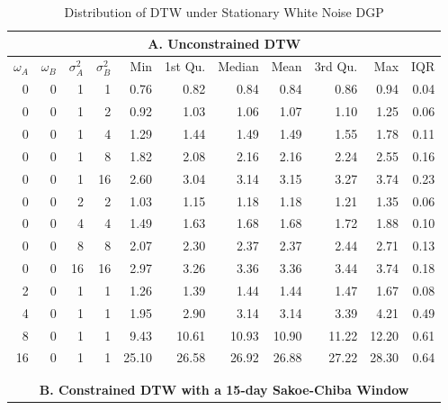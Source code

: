 \begin{table}[!ht]
    \centering
    \fontsize{10pt}{10pt}\selectfont
    \begin{threeparttable}
        \caption{Distribution of DTW under Stationary White Noise DGP} \label{tbl:dtw_white_noise}
        \begin{tabular}{r r r r | r r r r r r r}
            \multicolumn{11}{c}{\textbf{A. Unconstrained DTW}} \\
            \midrule
            $\omega_{A}$ & $\omega_{B}$ & $\sigma^{2}_{A}$ & $\sigma^{2}_{B}$ & Min & 1st Qu. & Median & Mean & 3rd Qu. & Max & IQR \\
            \midrule
            0  & 0 & 1  & 1  & 0.76 & 0.82 & 0.84 & 0.84 & 0.86 & 0.94 & 0.04 \\
            \midrule
            0  & 0 & 1  & 2  & 0.92 & 1.03 & 1.06 & 1.07 & 1.10 & 1.25 & 0.06 \\
            0  & 0 & 1  & 4  & 1.29 & 1.44 & 1.49 & 1.49 & 1.55 & 1.78 & 0.11 \\
            0  & 0 & 1  & 8  & 1.82 & 2.08 & 2.16 & 2.16 & 2.24 & 2.55 & 0.16 \\
            0  & 0 & 1  & 16 & 2.60 & 3.04 & 3.14 & 3.15 & 3.27 & 3.74 & 0.23 \\
            \midrule
            0  & 0 & 2  & 2  & 1.03 & 1.15 & 1.18 & 1.18 & 1.21 & 1.35 & 0.06 \\
            0  & 0 & 4  & 4  & 1.49 & 1.63 & 1.68 & 1.68 & 1.72 & 1.88 & 0.10 \\
            0  & 0 & 8  & 8  & 2.07 & 2.30 & 2.37 & 2.37 & 2.44 & 2.71 & 0.13 \\
            0  & 0 & 16 & 16 & 2.97 & 3.26 & 3.36 & 3.36 & 3.44 & 3.74 & 0.18 \\
            \midrule
            2  & 0 & 1  & 1  &  1.26 &  1.39 &  1.44 &  1.44 &  1.47 &  1.67 & 0.08 \\
            4  & 0 & 1  & 1  &  1.95 &  2.90 &  3.14 &  3.14 &  3.39 &  4.21 & 0.49 \\
            8  & 0 & 1  & 1  &  9.43 & 10.61 & 10.93 & 10.90 & 11.22 & 12.20 & 0.61 \\
            16 & 0 & 1  & 1  & 25.10 & 26.58 & 26.92 & 26.88 & 27.22 & 28.30 & 0.64 \\
            \hline
            \\
            \\
            \multicolumn{11}{c}{\textbf{B. Constrained DTW with a 15-day Sakoe-Chiba Window}} \\

\end{tabular}
\end{threeparttable}
\end{table}
